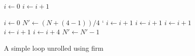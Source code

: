 \begin{figure}[h]
    \begin{minipage}[t]{0.5\textwidth}
        \centering
        \begin{algorithmic}
                \State $i \gets 0$
                    \State {}
                    \State $i \gets i + 1$
                \EndWhile
            \EndFunction
        \end{algorithmic}
    \end{minipage}
    \begin{minipage}[t]{0.5\textwidth}
        \centering
        \begin{algorithmic}
                \State $i \gets 0$
                \State $N' \gets (N + (4 - 1)) / 4$
`               
                        \State {}
                        \State $i \gets i + 1$ 
                    \EndCase
                        \State {}
                        \State $i \gets i + 1$ 
                    \EndCase
                        \State {}
                        \State $i \gets i + 1$ 
                    \EndCase
                        \State {}
                        \State $i \gets i + 1$
                    \EndCase
                \EndSwitch
                    \State {}
                    \State {}
                    \State {}
                    \State {}
                    \State $i \gets i + 4$
                    \State $N' \gets N' - 1$
                \EndWhile
            \EndFunction
        \end{algorithmic}
    \end{minipage}
    \caption{A simple loop unrolled using firm}
    \label{fig:basics:duff}
\end{figure}